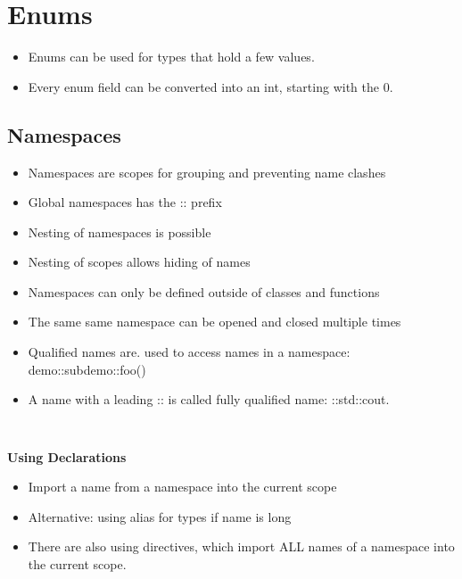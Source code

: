 
\section{Enums}
\begin{itemize}
  \itemsep -0.5em 
  \item Enums can be used for types that hold a few values.
  \item Every enum field can be converted into an int, starting with the 0. 
\end{itemize}


\subsection{Namespaces}
\begin{itemize}
  \itemsep -0.5em 
  \item Namespaces are scopes for grouping and preventing name clashes
  \item Global namespaces has the :: prefix
  \item Nesting of namespaces is possible
  \item Nesting of scopes allows hiding of names
  \item Namespaces can only be defined outside of classes and functions
  \item The same same namespace can be opened and closed multiple times
  \item Qualified names are. used to access names in a namespace: demo::subdemo::foo()
  \item A name with a leading :: is called fully qualified name: ::std::cout.
\end{itemize}
\begin{lstlisting}
	
\end{lstlisting}

\textbf{Using Declarations}
\begin{itemize}
  \itemsep -0.5em 
  \item Import a name from a namespace into the current scope
  \item Alternative: using alias for types if name is long
  \item There are also using directives, which import ALL names of a namespace into the current scope.
\end{itemize}

